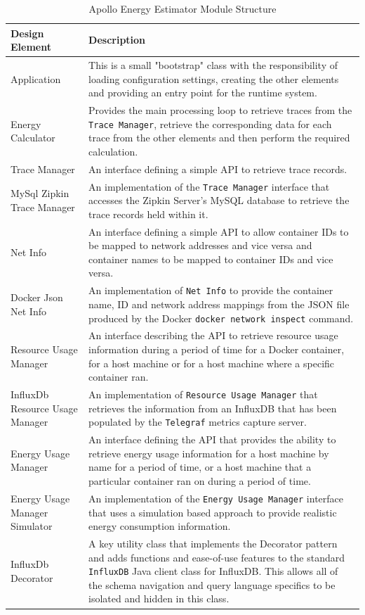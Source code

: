 \begin{table}
\centering
\caption{Apollo Energy Estimator Module Structure}
\label{table:classes}
\footnotesize
\begin{tabular}{|p{4cm}|p{9cm}|}
\hline
\textbf{Design Element} & \textbf{Description} \\
\hline
\hline
Application & This is a small "bootstrap" class with the responsibility of loading configuration settings, creating the other elements and providing an entry point for the runtime system. \\
\hline
Energy Calculator & Provides the main processing loop to retrieve traces from the \texttt{Trace Manager}, retrieve the corresponding data for each trace from the other elements and then perform the required calculation. \\
\hline
Trace Manager & An interface defining a simple API to retrieve trace records. \\
\hline
MySql Zipkin Trace \newline Manager & An implementation of the \texttt{Trace Manager} interface that accesses the Zipkin Server's MySQL database to retrieve the trace records held within it. \\
\hline
Net Info & An interface defining a simple API to allow container IDs to be mapped to network addresses and vice versa and container names to be mapped to container IDs and vice versa. \\
\hline
Docker Json Net Info & An implementation of \texttt{Net Info} to provide the container name, ID and network address mappings from the JSON file produced by the Docker \texttt{docker network inspect} command. \\
\hline
Resource Usage Manager & An interface describing the API to retrieve resource usage information during a period of time for a Docker container, for a host machine or for a host machine where a specific container ran. \\
\hline
InfluxDb Resource Usage \newline Manager & An implementation of \texttt{Resource Usage Manager} that retrieves the information from an InfluxDB that has been populated by the \texttt{Telegraf} metrics capture server. \\
\hline
Energy Usage Manager & An interface defining the API that provides the ability to retrieve energy usage information for a host machine by name for a period of time, or a host machine that a particular container ran on during a period of time. \\
\hline
Energy Usage Manager \newline Simulator & An implementation of the \texttt{Energy Usage Manager} interface that uses a simulation based approach to provide realistic energy consumption information. \\
\hline
InfluxDb Decorator & A key utility class that implements the Decorator pattern and adds functions and ease-of-use features to the standard \texttt{InfluxDB} Java client class for InfluxDB.  This allows all of the schema navigation and query language specifics to be isolated and hidden in this class. \\
\hline
\end{tabular} 
\end{table}

